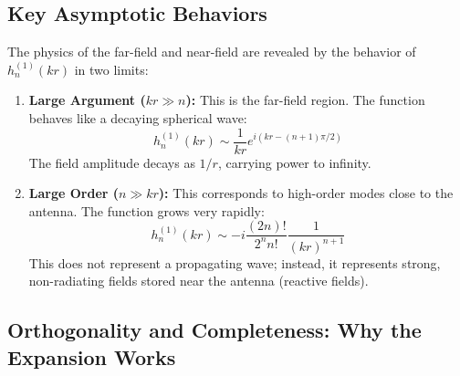 \documentclass[11pt,a4paper]{article}
\begin{document}
\subsection{Key Asymptotic Behaviors}

The physics of the far-field and near-field are revealed by the behavior of \(h_{n}^{(1)}(kr)\) in two limits:
\begin{enumerate}
    \item \textbf{Large Argument (\(kr\gg n\)):} This is the far-field region. The function behaves like a decaying spherical wave:
    \begin{equation}
        h_{n}^{(1)}(kr)\sim\frac{1}{kr}e^{i(kr-(n+1)\pi/2)}
    \end{equation}
    The field amplitude decays as \(1/r\), carrying power to infinity.
    
    \item \textbf{Large Order (\(n\gg kr\)):} This corresponds to high-order modes close to the antenna. The function grows very rapidly:
    \begin{equation}
        h_{n}^{(1)}(kr)\sim-i\frac{(2n)!}{2^{n}n!}\frac{1}{(kr)^{n+1}}
    \end{equation}
    This does not represent a propagating wave; instead, it represents strong, non-radiating fields stored near the antenna (reactive fields).
\end{enumerate}

\subsection{Orthogonality and Completeness: Why the Expansion Works}
\end{document}
